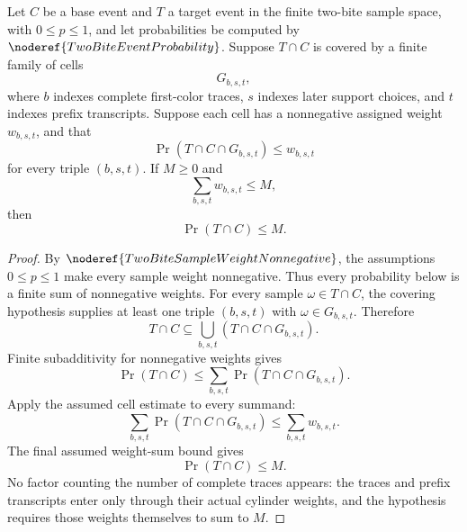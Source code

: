 \begin{helper}
Let \(C\) be a base event and \(T\) a target event in the finite two-bite
sample space, with \(0\le p\le1\), and let probabilities be computed by
\(\noderef{TwoBiteEventProbability}\).  Suppose \(T\cap C\) is covered by a
finite family of cells
\[
G_{b,s,t},
\]
where \(b\) indexes complete first-color traces, \(s\) indexes later support
choices, and \(t\) indexes prefix transcripts.  Suppose each cell has a
nonnegative assigned weight \(w_{b,s,t}\), and that
\[
\Pr(T\cap C\cap G_{b,s,t})\le w_{b,s,t}
\]
for every triple \((b,s,t)\).  If \(M\ge0\) and
\[
\sum_{b,s,t} w_{b,s,t}\le M,
\]
then
\[
\Pr(T\cap C)\le M.
\]
\end{helper}
\begin{proof}
By \(\noderef{TwoBiteSampleWeightNonnegative}\), the assumptions
\(0\le p\le1\) make every sample weight nonnegative.  Thus every probability
below is a finite sum of nonnegative weights.  For every sample
\(\omega\in T\cap C\), the covering hypothesis supplies at least one triple
\((b,s,t)\) with \(\omega\in G_{b,s,t}\).  Therefore
\[
T\cap C\subseteq \bigcup_{b,s,t}(T\cap C\cap G_{b,s,t}).
\]
Finite subadditivity for nonnegative weights gives
\[
\Pr(T\cap C)
\le
\sum_{b,s,t}\Pr(T\cap C\cap G_{b,s,t}).
\]
Apply the assumed cell estimate to every summand:
\[
\sum_{b,s,t}\Pr(T\cap C\cap G_{b,s,t})
\le
\sum_{b,s,t} w_{b,s,t}.
\]
The final assumed weight-sum bound gives
\[
\Pr(T\cap C)\le M.
\]
No factor counting the number of complete traces appears: the traces and
prefix transcripts enter only through their actual cylinder weights, and the
hypothesis requires those weights themselves to sum to \(M\).
\end{proof}
